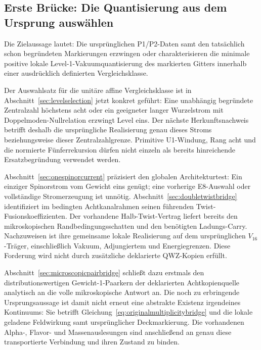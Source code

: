 
\subsection{Erste Brücke: Die Quantisierung aus dem Ursprung auswählen}
Die Zielaussage lautet: Die ursprünglichen P1/P2-Daten samt den tatsächlich schon begründeten Markierungen erzwingen oder charakterisieren die minimale positive lokale Level-1-Vakuumquantisierung des markierten Gitters innerhalb einer ausdrücklich definierten Vergleichsklasse.

Der Auswahlsatz für die unitäre affine Vergleichsklasse ist in Abschnitt~\ref{sec:levelselection} jetzt konkret geführt: Eine unabhängig begründete Zentralzahl höchstens acht oder ein geeigneter langer Wurzelstrom mit Doppelmoden-Nullrelation erzwingt Level eins. Der nächste Herkunftsnachweis betrifft deshalb die ursprüngliche Realisierung genau dieses Stroms beziehungsweise dieser Zentralzahlgrenze. Primitive U1-Windung, Rang acht und die normierte Fünferrekursion dürfen nicht einzeln als bereits hinreichende Ersatzbegründung verwendet werden.

Abschnitt~\ref{sec:onespinorcurrent} präzisiert den globalen Architekturtest: Ein einziger Spinorstrom vom Gewicht eins genügt; eine vorherige E8-Auswahl oder vollständige Stromerzeugung ist unnötig. Abschnitt~\ref{sec:doubletwistbridge} identifiziert im bedingten Achtkanalrahmen seinen führenden Twist-Fusionskoeffizienten. Der vorhandene Halb-Twist-Vertrag liefert bereits den mikroskopischen Randbedingungsschatten und den benötigten Ladungs-Carry. Nachzuweisen ist ihre gemeinsame lokale Realisierung auf dem ursprünglichen $V_{16}$-Träger, einschließlich Vakuum, Adjungiertem und Energiegrenzen. Diese Forderung wird nicht durch zusätzliche deklarierte QWZ-Kopien erfüllt.

Abschnitt~\ref{sec:microscopicpairbridge} schließt dazu erstmals den distributionswertigen Gewicht-1-Paarkern der deklarierten Achtkopienquelle analytisch an die volle mikroskopische Antwort an. Die noch zu erbringende Ursprungsaussage ist damit nicht erneut eine abstrakte Existenz irgendeines Kontinuums: Sie betrifft Gleichung~\eqref{eq:originalmultiplicitybridge} und die lokale geladene Feldwirkung samt ursprünglicher Deckmarkierung. Die vorhandenen Alpha-, Flavor- und Massenauslesungen sind anschließend an genau diese transportierte Verbindung und ihren Zustand zu binden.

